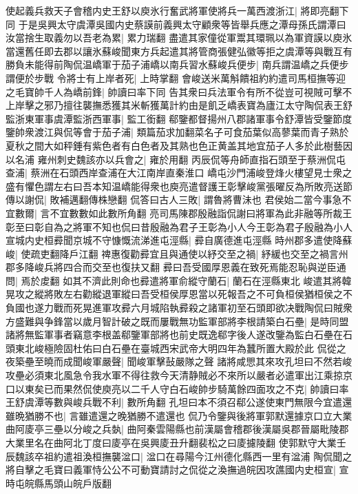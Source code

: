 使起義兵救天子會稽内史王舒以庾氷行奮武將軍使將兵一萬西渡浙江|{
	將即亮翻下同}
于是吳興太守虞潭吳國内史蔡謨前義興太守顧衆等皆舉兵應之潭母孫氏謂潭曰汝當捨生取義勿以吾老為累|{
	累力瑞翻}
盡遣其家僮從軍鬻其環珮以為軍資謨以庾氷當還舊任即去郡以讓氷蘇峻聞東方兵起遣其將管商張健弘徽等拒之虞潭等與戰互有勝負未能得前陶侃温嶠軍于茄子浦嶠以南兵習水蘇峻兵便步|{
	南兵謂温嶠之兵便步謂便於步戰}
令將士有上岸者死|{
	上時掌翻}
會峻送米萬斛饋祖約約遣司馬桓撫等迎之毛寶帥千人為嶠前鋒|{
	帥讀曰率下同}
告其衆曰兵法軍令有所不從豈可視賊可擊不上岸擊之邪乃擅往襲撫悉獲其米斬獲萬計約由是飢乏嶠表寶為廬江太守陶侃表王舒監浙東軍事虞潭監浙西軍事|{
	監工銜翻}
郗鑒都督揚州八郡諸軍事令舒潭皆受鑒節度鑒帥衆渡江與侃等會于茄子浦|{
	類篇茄求加翻菜名子可食茄葉似高蓼葉而青子熟於夏秋之間大如秤錘有紫色者有白色者及其熟也色正黄盖其地宜茄子人多於此樹藝因以名浦}
雍州刺史魏該亦以兵會之|{
	雍於用翻}
丙辰侃等舟師直指石頭至于蔡洲侃屯查浦|{
	蔡洲在石頭西岸查浦在大江南岸直秦淮口}
嶠屯沙門浦峻登烽火樓望見士衆之盛有懼色謂左右曰吾本知温嶠能得衆也庾亮遣督護王彰擊峻黨張曜反為所敗亮送節傳以謝侃|{
	敗補邁翻傳株戀翻}
侃答曰古人三敗|{
	謂魯將曹沬也}
君侯始二當今事急不宜數爾|{
	言不宜數數如此數所角翻}
亮司馬陳郡殷融詣侃謝曰將軍為此非融等所裁王彰至曰彰自為之將軍不知也侃曰昔殷融為君子王彰為小人今王彰為君子殷融為小人宣城内史桓彛聞京城不守慷慨流涕進屯涇縣|{
	彛自廣德進屯涇縣}
時州郡多遣使降蘇峻|{
	使疏吏翻降戶江翻}
禆惠復勸彛宜且與通使以紓交至之禍|{
	紓緩也交至之禍言州郡多降峻兵將四合而交至也復扶又翻}
彛曰吾受國厚恩義在致死焉能忍恥與逆臣通問|{
	焉於䖍翻}
如其不濟此則命也彛遣將軍俞縱守蘭石|{
	蘭石在涇縣東北}
峻遣其將韓晃攻之縱將敗左右勸縱退軍縱曰吾受桓侯厚恩當以死報吾之不可負桓侯猶桓侯之不負國也遂力戰而死晃進軍攻彛六月城陷執彛殺之諸軍初至石頭即欲决戰陶侃曰賊衆方盛難與争鋒當以歲月智計破之既而屢戰無功監軍部將李根請築白石壘|{
	是時同盟諸將無監軍事者竊意李根盖郗鑒軍部將也前史既逸郗字後人遂改鑒為監白石壘在石頭東北峻極險固杜佑曰白石壘在臺城西宋武帝大明四年為蠶所置大殿於此}
侃從之夜築壘至曉而成聞峻軍嚴聲|{
	聞峻軍擊鼔嚴隊之聲}
諸將咸愳其來攻孔坦曰不然若峻攻壘必須東北風急令我水軍不得往救今天清静賊必不來所以嚴者必遣軍出江乘掠京口以東矣已而果然侃使庾亮以二千人守白石峻帥步騎萬餘四面攻之不克|{
	帥讀曰率}
王舒虞潭等數與峻兵戰不利|{
	數所角翻}
孔坦曰本不須召郗公遂使東門無限今宜遣還雖晩猶勝不也|{
	言雖遣還之晚猶勝不遣還也}
侃乃令鑒與後將軍郭默還據京口立大業曲阿庱亭三壘以分峻之兵埶|{
	曲阿秦雲陽縣也前漢屬會稽郡後漢屬吳郡晉屬毗陵郡大業里名在曲阿北丁度曰庱亭在吳興庱丑升翻裴松之曰庱攄陵翻}
使郭默守大業壬辰魏該卒祖約遣祖渙桓撫襲湓口|{
	湓口在尋陽今江州德化縣西一里有湓浦}
陶侃聞之將自擊之毛寶曰義軍恃公公不可動寶請討之侃從之渙撫過皖因攻譙國内史桓宣|{
	宣時屯皖縣馬頭山皖戶版翻}
